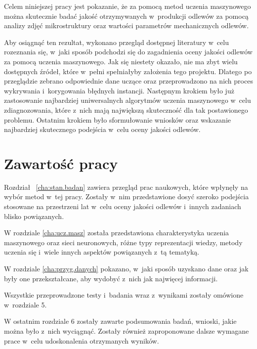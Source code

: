 Celem niniejszej pracy jest pokazanie, że za pomocą metod uczenia maszynowego można skutecznie badać jakość otrzymywanych w~produkcji odlewów za pomocą analizy zdjęć mikrostruktury oraz wartości parametrów mechanicznych odlewów. 

Aby osiągnąć ten rezultat, wykonano przegląd dostępnej literatury w~celu rozeznania się, w~jaki sposób podchodzi się do zagadnienia oceny jakości odlewów za pomocą uczenia maszynowego. Jak się niestety okazało, nie ma zbyt wielu dostępnych źródeł, które w~pełni spełniałyby założenia tego projektu. Dlatego po przeglądzie zebrano odpowiednie dane uczące oraz przeprowadzono na nich proces wykrywania i~korygowania błędnych instancji. Następnym krokiem było już zastosowanie najbardziej uniwersalnych algorytmów uczenia maszynowego w~celu zdiagnozowania, które z~nich mają największą skuteczność dla tak postawionego problemu. Ostatnim krokiem było sformułowanie wniosków oraz wskazanie najbardziej skutecznego podejścia w~celu oceny jakości odlewów.



\section{Zawartość pracy}
\label{sec:zawartosc}

Rozdział ~\ref{cha:stan.badan} zawiera przegląd prac naukowych, które wpłynęły na wybór metod w~tej pracy. Zostały w~nim przedstawione dosyć szeroko podejścia stosowane na przestrzeni lat w~celu oceny jakości odlewów i~innych zadaniach blisko powiązanych. 

W rozdziale \ref{cha:ucz.masz} została przedstawiona charakterystyka uczenia maszynowego oraz sieci neuronowych, różne typy reprezentacji wiedzy, metody uczenia się i~wiele innych aspektów powiązanych z~tą tematyką. 

W rozdziale \ref{cha:przyg.danych} pokazano, w~jaki sposób uzyskano dane oraz jak były one przekształcane, aby wydobyć z~nich jak najwięcej informacji. 

Wszystkie przeprowadzone testy i~badania wraz z~wynikami zostały omówione w~rozdziale 5. 

W ostatnim rozdziale 6 zostały zawarte podsumowania badań, wnioski, jakie można było z~nich wyciągnąć. Zostały również zaproponowane dalsze wymagane prace w~celu udoskonalenia otrzymanych wyników.













